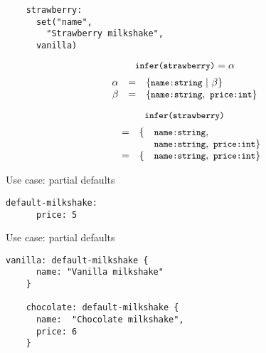 \documentclass[20pt]{beamer}
\newcommand{\code}[1]{
    \texttt{\small{#1}}
}
\begin{document}
\begin{frame}
    \begin{lstlisting}
    strawberry:
      set("name",
        "Strawberry milkshake",
      vanilla)
    \end{lstlisting}
\end{frame}


\begin{frame}
    \[
    \code{infer(strawberry)} = \alpha
    \]
    \[
    \begin{array}{rcl}
    \alpha & = & \{ \code{name:} \code{string} ~ | ~ \beta  \} \\
    \beta  & = & \{ \code{name:} \code{string}, ~ \code{price:} \code{int} \} \\
    \end{array}
    \]
\end{frame}

\begin{frame}
    \[
    \code{infer(strawberry)}
    \]
    \[
    \begin{array}{llll}
    ~ & = & \{ & \code{name:} \code{string}, \\
      &   &    & \code{name:} \code{string}, ~ \code{price:} \code{int} \} \\
      & = & \{ & \code{name:} \code{string}, ~ \code{price:} \code{int} \} \\
    \end{array}
    \]
\end{frame}

\begin{frame}[fragile]{Use case: partial defaults}
    \begin{lstlisting}[keywords = {}]
    default-milkshake:
      price: 5
    \end{lstlisting}
\end{frame}

\begin{frame}[fragile]{Use case: partial defaults}
    \begin{lstlisting}[keywords = {}]
    vanilla: default-milkshake {
      name: "Vanilla milkshake"
    }

    chocolate: default-milkshake {
      name:  "Chocolate milkshake",
      price: 6
    }
    \end{lstlisting}
\end{frame}

\end{document}
